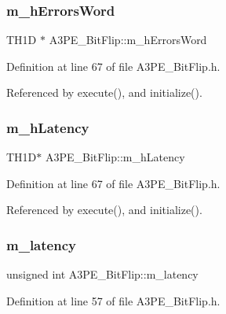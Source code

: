 \subsubsection{\texorpdfstring{m\+\_\+h\+Errors\+Word}{m\_hErrorsWord}}
{\footnotesize\ttfamily T\+H1D $\ast$ A3\+P\+E\+\_\+\+Bit\+Flip\+::m\+\_\+h\+Errors\+Word\hspace{0.3cm}{\ttfamily [private]}}



Definition at line 67 of file A3\+P\+E\+\_\+\+Bit\+Flip.\+h.



Referenced by execute(), and initialize().

\mbox{\label{classA3PE__BitFlip_a83928ea28c555c19f4e95cf7863c1b0c}} 
\subsubsection{\texorpdfstring{m\+\_\+h\+Latency}{m\_hLatency}}
{\footnotesize\ttfamily T\+H1D$\ast$ A3\+P\+E\+\_\+\+Bit\+Flip\+::m\+\_\+h\+Latency\hspace{0.3cm}{\ttfamily [private]}}



Definition at line 67 of file A3\+P\+E\+\_\+\+Bit\+Flip.\+h.



Referenced by execute(), and initialize().

\mbox{\label{classA3PE__BitFlip_a6f5ad1d6595e98c2fbd58f43e2754322}} 
\subsubsection{\texorpdfstring{m\+\_\+latency}{m\_latency}}
{\footnotesize\ttfamily unsigned int A3\+P\+E\+\_\+\+Bit\+Flip\+::m\+\_\+latency\hspace{0.3cm}{\ttfamily [private]}}



Definition at line 57 of file A3\+P\+E\+\_\+\+Bit\+Flip.\+h.



